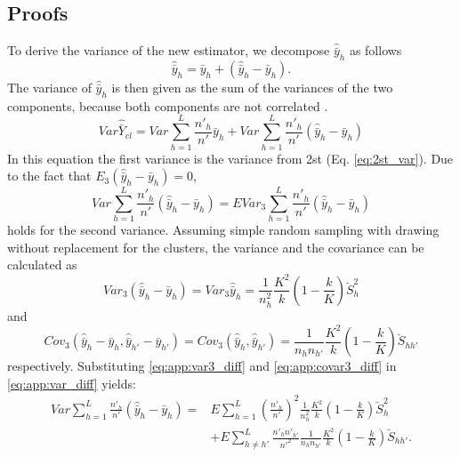 \subsection{Proofs}
To derive the variance of the new estimator, we decompose $\hat{\bar{y}}_h$ as follows
\begin{equation}
 \hat{\bar{y}}_h=\bar{y}_h+\left(\hat{\bar{y}}_h-\bar{y}_h\right).
\end{equation}
The variance of $\hat{\bar{y}}_h$ is then given as the sum of the variances of the two components, because both components are not correlated \citep[see (12.6) in][]{Cochran_1977}.
\begin{equation}
 Var\hat{\bar{Y}}_{cl}=Var\sum_{h=1}^{L}\frac{n'_h}{n'}\bar{y}_h+Var\sum_{h=1}^{L}\frac{n'_h}{n'}\left(\hat{\bar{y}}_h-\bar{y}_h\right)
\end{equation}
In this equation the first variance is the variance from 2st (Eq. \ref{eq:2st_var}). Due to the fact that $E_3(\hat{\bar{y}}_h-\bar{y}_h)=0$,
\begin{equation}
 Var\sum_{h=1}^{L}\frac{n'_h}{n'}\left(\hat{\bar{y}}_h-\bar{y}_h\right)=E Var_3\sum_{h=1}^{L}\frac{n'_h}{n'}\left(\hat{\bar{y}}_h-\bar{y}_h\right)
\label{eq:app:var_diff}
\end{equation}
holds for the second variance. Assuming simple random sampling with drawing without replacement for the clusters, the variance and the covariance can be calculated as
\begin{equation}
Var_3\left(\hat{\bar{y}}_h-\bar{y}_h\right)=Var_3\hat{\bar{y}}_h=\frac{1}{n_h^2}\frac{K^2}{k}\left(1-\frac{k}{K}\right)\breve{S}_h^2
\label{eq:app:var3_diff}
\end{equation}
and
\begin{equation}
Cov_3 \left(\hat{\bar{y}}_h-\bar{y}_h,\hat{\bar{y}}_{h'}-\bar{y}_{h'}\right)=Cov_3\left(\hat{\bar{y}}_{h},\hat{\bar{y}}_{h'}\right)=\frac{1}{n_h n_{h'}}\frac{K^2}{k}\left(1-\frac{k}{K}\right)\breve{S}_{hh'}
\label{eq:app:covar3_diff}
\end{equation}
respectively. Substituting \eqref{eq:app:var3_diff} and \eqref{eq:app:covar3_diff} in \eqref{eq:app:var_diff} yields:
\begin{equation}
\begin{aligned}
 Var\sum_{h=1}^{L}\frac{n'_h}{n'}\left(\hat{\bar{y}}_h-\bar{y}_h\right)=&E\sum_{h=1}^{L}\left(\frac{n'_h}{n'}\right)^2 \frac{1}{n_h^2}\frac{K^2}{k}\left(1-\frac{k}{K}\right)\breve{S}_h^2\\
&+E\sum_{h \neq h'}^{L}\frac{n'_h n'_{h'}}{n'^2}\frac{1}{n_h n_{h'}}\frac{K^2}{k}\left(1-\frac{k}{K}\right)\breve{S}_{hh'}.
\end{aligned}
\end{equation}




 


 


  






  
  

